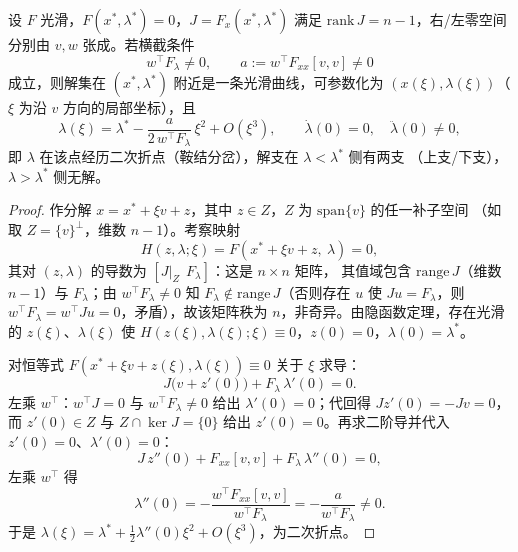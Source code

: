 \begin{theorem}[二次折点的刻画]\label{thm:pf-th-vs-snb}
设 $F$ 光滑，$F(x^*,\lambda^*)=0$，$J=F_x(x^*,\lambda^*)$ 满足
$\mathrm{rank}\,J=n-1$，右/左零空间分别由 $v,w$ 张成。若横截条件
\begin{equation}
w^{\top}F_\lambda\neq0,\qquad a:=w^{\top}F_{xx}[v,v]\neq0
\end{equation}
成立，则解集在 $(x^*,\lambda^*)$ 附近是一条光滑曲线，可参数化为
$(x(\xi),\lambda(\xi))$（$\xi$ 为沿 $v$ 方向的局部坐标），且
\begin{equation}
\lambda(\xi)=\lambda^*-\frac{a}{2\,w^{\top}F_\lambda}\,\xi^{2}+O(\xi^{3}),\qquad
\dot\lambda(0)=0,\quad \ddot\lambda(0)\neq0,
\end{equation}
即 $\lambda$ 在该点经历二次折点（鞍结分岔），解支在 $\lambda<\lambda^*$ 侧有两支
（上支/下支），$\lambda>\lambda^*$ 侧无解。
\end{theorem}
\begin{proof}
作分解 $x=x^*+\xi v+z$，其中 $z\in Z$，$Z$ 为 $\mathrm{span}\{v\}$ 的任一补子空间
（如取 $Z=\{v\}^{\perp}$，维数 $n-1$）。考察映射
\begin{equation}
H(z,\lambda;\xi)=F(x^*+\xi v+z,\ \lambda)=0,
\end{equation}
其对 $(z,\lambda)$ 的导数为 $[J|_{Z}\ \ F_\lambda]$：这是 $n\times n$ 矩阵，
其值域包含 $\mathrm{range}\,J$（维数 $n-1$）与 $F_\lambda$；由
$w^{\top}F_\lambda\neq0$ 知 $F_\lambda\notin\mathrm{range}\,J$（否则存在 $u$
使 $Ju=F_\lambda$，则 $w^{\top}F_\lambda=w^{\top}Ju=0$，矛盾），故该矩阵秩为
$n$，非奇异。由隐函数定理，存在光滑的 $z(\xi)$、$\lambda(\xi)$ 使
$H(z(\xi),\lambda(\xi);\xi)\equiv0$，$z(0)=0$，$\lambda(0)=\lambda^*$。

对恒等式 $F(x^*+\xi v+z(\xi),\lambda(\xi))\equiv0$ 关于 $\xi$ 求导：
\begin{equation}
J\bigl(v+z'(0)\bigr)+F_\lambda\,\lambda'(0)=0.
\end{equation}
左乘 $w^{\top}$：$w^{\top}J=0$ 与 $w^{\top}F_\lambda\neq0$ 给出
$\lambda'(0)=0$；代回得 $Jz'(0)=-Jv=0$，而 $z'(0)\in Z$ 与 $Z\cap\ker J=\{0\}$
给出 $z'(0)=0$。再求二阶导并代入 $z'(0)=0$、$\lambda'(0)=0$：
\begin{equation}
J\,z''(0)+F_{xx}[v,v]+F_\lambda\,\lambda''(0)=0,
\end{equation}
左乘 $w^{\top}$ 得
\begin{equation}
\lambda''(0)=-\frac{w^{\top}F_{xx}[v,v]}{w^{\top}F_\lambda}=-\frac{a}{w^{\top}F_\lambda}\neq0.
\end{equation}
于是 $\lambda(\xi)=\lambda^*+\tfrac12\lambda''(0)\xi^2+O(\xi^3)$，为二次折点。
\end{proof}

